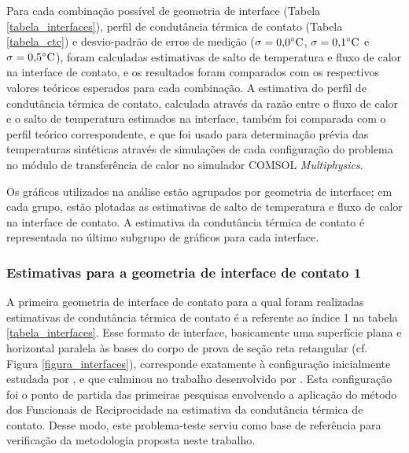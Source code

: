 Para cada combinação possível de geometria de interface (Tabela \ref{tabela_interfaces}), perfil de condutância térmica de contato (Tabela \ref{tabela_ctc}) e desvio-padrão de erros de medição ($\sigma = \text{0,0}\celsius$, $\sigma = \text{0,1}\celsius$ e $\sigma = \text{0,5}\celsius$), foram calculadas estimativas de salto de temperatura e fluxo de calor na interface de contato, e os resultados foram comparados com os respectivos valores teóricos esperados para cada combinação. A estimativa do perfil de condutância térmica de contato, calculada através da razão entre o fluxo de calor e o salto de temperatura estimados na interface, também foi comparada com o perfil teórico correspondente, e que foi usado para determinação prévia das temperaturas sintéticas através de simulações de cada configuração do problema no módulo de transferência de calor no simulador COMSOL \textit{Multiphysics}\textsuperscript{\textregistered}.

Os gráficos utilizados na análise estão agrupados por geometria de interface; em cada grupo, estão plotadas as estimativas de salto de temperatura e fluxo de calor na interface de contato. A estimativa da condutância térmica de contato é representada no último subgrupo de gráficos para cada interface.


\subsubsection{Estimativas para a geometria de interface de contato 1}

A primeira geometria de interface de contato para a qual foram realizadas estimativas de condutância térmica de contato é a referente ao índice 1 na tabela \ref{tabela_interfaces}. Esse formato de interface, basicamente uma superfície plana e horizontal paralela às bases do corpo de prova de seção reta retangular (cf. Figura \ref{figura_interfaces}), corresponde exatamente à configuração inicialmente estudada por \cite{reciproc_3}, e que culminou no trabalho desenvolvido por \cite{tese_padilha}. Esta configuração foi o ponto de partida das primeiras pesquisas envolvendo a aplicação do método dos Funcionais de Reciprocidade na estimativa da condutância térmica de contato. Desse modo, este problema-teste serviu como base de referência para verificação da metodologia proposta neste trabalho.

